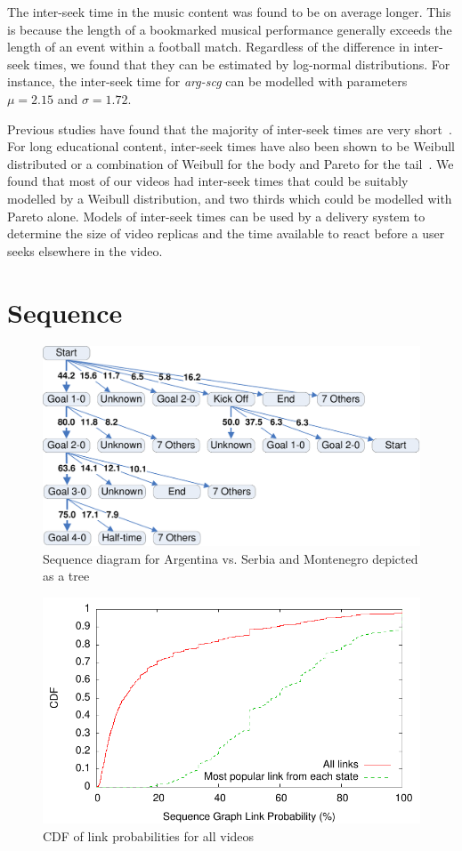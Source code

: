 The inter-seek time in the music content was found to be on average longer. This is because the length of a bookmarked musical performance generally exceeds the length of an event within a football match. Regardless of the difference in inter-seek times, we found that they can be estimated by log-normal distributions. For instance, the inter-seek time for \emph{arg-scg} can be modelled with parameters $\mu=2.15$ and $\sigma=1.72$.

Previous studies have found that the majority of inter-seek times are very short~\cite{vilas2005uba}. For long educational content, inter-seek times have also been shown to be Weibull distributed or a combination of Weibull for
the body and Pareto for the tail~\cite{almeida2001aem}. We found that most of our videos had inter-seek times that could be suitably modelled by a Weibull distribution, and two thirds which could be modelled with Pareto alone. Models of inter-seek times can be used by a delivery system to determine the size of video replicas and the time available to react before a user seeks elsewhere in the video.

\section{Sequence}
\label{sect:sequence}

\begin{figure}[t]
    \centering
    \includegraphics[width=0.50\columnwidth]{./diagrams/sequence}
    \caption{Sequence diagram for Argentina vs. Serbia and Montenegro depicted as a tree}
    \label{fig:sequences}
\end{figure}

\begin{figure}[t]
    \centering
    \includegraphics[width=0.50\columnwidth]{./graphs/all_sequence_normal_cdf}
    \caption{CDF of link probabilities for all videos}
    \label{fig:all_sequence}
\end{figure}

